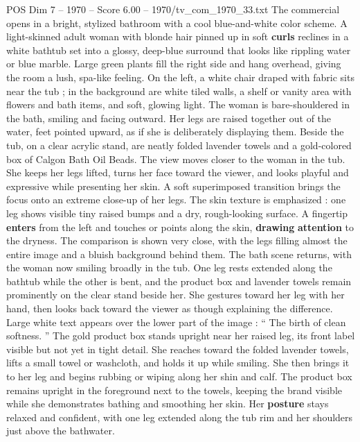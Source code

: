 \begin{textsample}{POS Dim 7 – 1970 – Score 6.00 – 1970/tv\_com\_1970\_33.txt}  \label{ex:f7_pos_037}
The commercial opens in a bright, stylized bathroom with a cool blue-and-white color scheme.
A light-skinned adult woman with blonde hair pinned up in soft \textbf{curls} reclines in a white bathtub set into a glossy, deep-blue surround that looks like rippling water or blue marble.
Large green plants fill the right side and hang overhead, giving the room a lush, spa-like feeling.
On the left, a white chair draped with fabric sits near the tub ; in the background are white tiled walls, a shelf or vanity area with flowers and bath items, and soft, glowing light.
The woman is bare-shouldered in the bath, smiling and facing outward.
Her legs are raised together out of the water, feet pointed upward, as if she is deliberately displaying them.
Beside the tub, on a clear acrylic stand, are neatly folded lavender towels and a gold-colored box of Calgon Bath Oil Beads.
The view moves closer to the woman in the tub.
She keeps her legs lifted, turns her face toward the viewer, and looks playful and expressive while presenting her skin.
A soft superimposed transition brings the focus onto an extreme close-up of her legs.
The skin texture is emphasized : one leg shows visible tiny raised bumps and a dry, rough-looking surface.
A fingertip \textbf{enters} from the left and touches or points along the skin, \textbf{drawing} \textbf{attention} to the dryness.
The comparison is shown very close, with the legs filling almost the entire image and a bluish background behind them.
The bath scene returns, with the woman now smiling broadly in the tub.
One leg rests extended along the bathtub while the other is bent, and the product box and lavender towels remain prominently on the clear stand beside her.
She gestures toward her leg with her hand, then looks back toward the viewer as though explaining the difference.
Large white text appears over the lower part of the image : “ The birth of clean softness. ” The gold product box stands upright near her raised leg, its front label visible but not yet in tight detail.
She reaches toward the folded lavender towels, lifts a small towel or washcloth, and holds it up while smiling.
She then brings it to her leg and begins rubbing or wiping along her shin and calf.
The product box remains upright in the foreground next to the towels, keeping the brand visible while she demonstrates bathing and smoothing her skin.
Her \textbf{posture} stays relaxed and confident, with one leg extended along the tub rim and her shoulders just above the bathwater.

\end{textsample}
